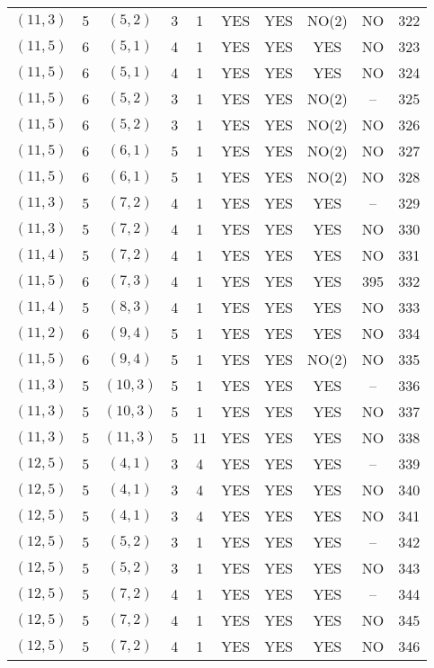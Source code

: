 \begin{longtable}{|c|c|c|c|c|c|c|c|c|c|}
$(11, 3)$ & 5 & $(5, 2)$ & 3 & 1 & YES & YES & NO(2) & NO & 322\\
$(11, 5)$ & 6 & $(5, 1)$ & 4 & 1 & YES & YES & YES & NO & 323\\
$(11, 5)$ & 6 & $(5, 1)$ & 4 & 1 & YES & YES & YES & NO & 324\\
$(11, 5)$ & 6 & $(5, 2)$ & 3 & 1 & YES & YES & NO(2) & -- & 325\\
$(11, 5)$ & 6 & $(5, 2)$ & 3 & 1 & YES & YES & NO(2) & NO & 326\\
$(11, 5)$ & 6 & $(6, 1)$ & 5 & 1 & YES & YES & NO(2) & NO & 327\\
$(11, 5)$ & 6 & $(6, 1)$ & 5 & 1 & YES & YES & NO(2) & NO & 328\\
$(11, 3)$ & 5 & $(7, 2)$ & 4 & 1 & YES & YES & YES & -- & 329\\
$(11, 3)$ & 5 & $(7, 2)$ & 4 & 1 & YES & YES & YES & NO & 330\\
$(11, 4)$ & 5 & $(7, 2)$ & 4 & 1 & YES & YES & YES & NO & 331\\
$(11, 5)$ & 6 & $(7, 3)$ & 4 & 1 & YES & YES & YES & 395 & 332\\
$(11, 4)$ & 5 & $(8, 3)$ & 4 & 1 & YES & YES & YES & NO & 333\\
$(11, 2)$ & 6 & $(9, 4)$ & 5 & 1 & YES & YES & YES & NO & 334\\
$(11, 5)$ & 6 & $(9, 4)$ & 5 & 1 & YES & YES & NO(2) & NO & 335\\
$(11, 3)$ & 5 & $(10, 3)$ & 5 & 1 & YES & YES & YES & -- & 336\\
$(11, 3)$ & 5 & $(10, 3)$ & 5 & 1 & YES & YES & YES & NO & 337\\
$(11, 3)$ & 5 & $(11, 3)$ & 5 & 11 & YES & YES & YES & NO & 338\\
$(12, 5)$ & 5 & $(4, 1)$ & 3 & 4 & YES & YES & YES & -- & 339\\
$(12, 5)$ & 5 & $(4, 1)$ & 3 & 4 & YES & YES & YES & NO & 340\\
$(12, 5)$ & 5 & $(4, 1)$ & 3 & 4 & YES & YES & YES & NO & 341\\
$(12, 5)$ & 5 & $(5, 2)$ & 3 & 1 & YES & YES & YES & -- & 342\\
$(12, 5)$ & 5 & $(5, 2)$ & 3 & 1 & YES & YES & YES & NO & 343\\
$(12, 5)$ & 5 & $(7, 2)$ & 4 & 1 & YES & YES & YES & -- & 344\\
$(12, 5)$ & 5 & $(7, 2)$ & 4 & 1 & YES & YES & YES & NO & 345\\
$(12, 5)$ & 5 & $(7, 2)$ & 4 & 1 & YES & YES & YES & NO & 346\\

\end{longtable}
